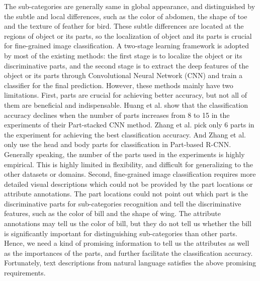 \documentclass[10pt,twocolumn,letterpaper]{article}
\begin{document}
\par 
The sub-categories are generally same in global appearance, and distinguished by the subtle and local differences, such as the color of abdomen, the shape of toe and the texture of feather for bird. These subtle differences are located at the regions of object or its parts, so the localization of object and its parts is crucial for fine-grained image classification. A two-stage learning framework is adopted by most of the existing methods: the first stage is to localize the object or its discriminative parts, and the second stage is to extract the deep features of the object or its parts through Convolutional Neural Network (CNN) and train a classifier for the final prediction. However, these methods mainly have two limitations. First, parts are crucial for achieving better accuracy, but not all of them are beneficial and indispensable. Huang et al. \cite{partstacked} show that the classification accuracy declines when the number of parts increases from 8 to 15 in the experiments of their Part-stacked CNN method. Zhang et al. \cite{picking} pick only 6 parts in the experiment for achieving the best classification accuracy. And Zhang et al. \cite{partrcnn} only use the head and body parts for classification in Part-based R-CNN. Generally speaking, the number of the parts used in the experiments is highly empirical. This is highly limited in flexibility, and difficult for generalizing to the other datasets or domains. Second, fine-grained image classification requires more detailed visual descriptions which could not be provided by the part locations or attribute annotations. The part locations could not point out which part is the discriminative parts for sub-categories recognition and tell the discriminative features, such as the color of bill and the shape of wing. The attribute annotations may tell us the color of bill, but they do not tell us whether the bill is significantly important for distinguishing sub-categories than other parts. Hence, we need a kind of promising information to tell us the attributes as well as the importances of the parts, and further facilitate the classification accuracy. Fortunately, text descriptions from natural language satisfies the above promising requirements.
\par
\end{document}
